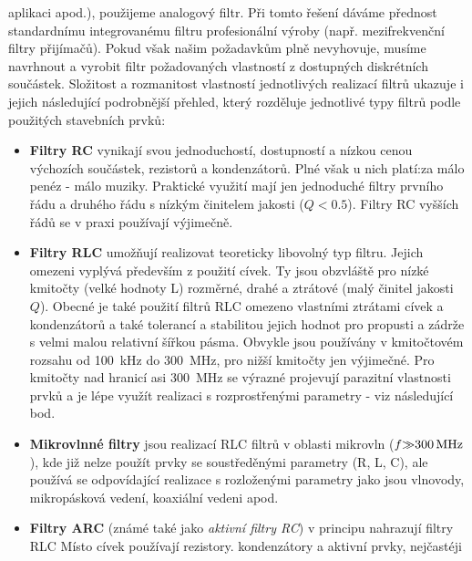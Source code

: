 {        aplikaci apod.), použijeme analogový filtr. Při tomto řešení dáváme přednost standardnímu
        integrovanému filtru profesionální výroby (např. mezifrekvenční filtry přijímačů). Pokud
        však našim požadavkům plně nevyhovuje, musíme navrhnout a vyrobit filtr požadovaných
        vlastností z dostupných diskrétních součástek. Složitost a rozmanitost vlastností
        jednotlivých realizací filtrů ukazuje i jejich následující podrobnější přehled, který
        rozděluje jednotlivé typy filtrů podle použitých stavebních prvků:
        \begin{itemize}
          \item \textbf{Filtry RC} vynikají svou jednoduchostí, dostupností a nízkou cenou výchozích
                součástek, rezistorů a kondenzátorů. Plné však u nich platí:za málo penéz - málo
                muziky. Praktické využití mají jen jednoduché filtry prvního řádu a druhého řádu s
                nízkým činitelem jakosti (\(Q < \num{0.5}\)). Filtry RC vyšších řádů se v praxi
                používají výjimečně.
          \item \textbf{Filtry RLC} umožňují realizovat teoreticky libovolný typ filtru. Jejich
                omezeni vyplývá především z použití cívek. Ty jsou obzvláště pro nízké kmitočty
                (velké hodnoty L) rozměrné, drahé a ztrátové (malý činitel jakosti \(Q\)). Obecné je
                také použití filtrů RLC omezeno vlastními ztrátami cívek a kondenzátorů a také
                tolerancí a stabilitou jejich hodnot pro propusti a zádrže s velmi malou relativní
                šířkou pásma. Obvykle jsou používány v kmitočtovém rozsahu od \SI{100}{\kilo\hertz}
                do \SI{300}{\mega\hertz}, pro nižší kmitočty jen výjimečné. Pro kmitočty nad
                hranicí asi \SI{300}{\mega\hertz} se výrazné projevují parazitní vlastnosti prvků a
                je lépe využít realizaci s rozprostřenými parametry - viz následující bod.
          \item \textbf{Mikrovlnné filtry} jsou realizací RLC filtrů v oblasti mikrovln (\(f
                \SI{>>300}{\mega\hertz}\)), kde již nelze použít prvky se soustředěnými parametry
                (R, L, C), ale používá se odpovídající realizace s rozloženými parametry jako jsou
                vlnovody, mikropásková vedení, koaxiální vedeni apod.
          \item \textbf{Filtry ARC} (známé také jako \emph{aktivní filtry RC}) v principu nahrazují
                filtry RLC Místo cívek používají rezistory. kondenzátory a aktivní prvky, nejčastéji

\end{itemize}}
